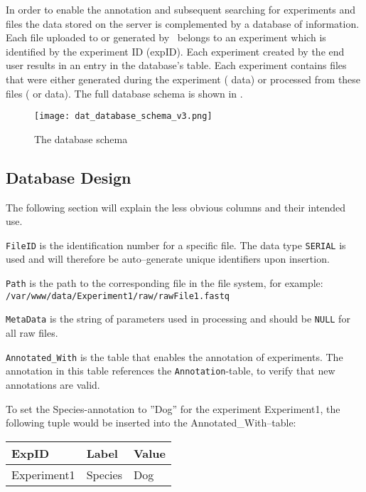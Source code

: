 In order to enable the annotation and subsequent searching for experiments and files the data stored on the server is complemented by a database of information. Each file uploaded to or generated by \appName\ belongs to an experiment which is identified by the experiment ID (expID). Each experiment created by the end user results in an entry in the database's  table. Each experiment contains files that were either generated during the experiment ( data) or processed from these files ( or  data). The full database schema is shown in .

\begin{figure}[p]
\centering
\texttt{[image: dat\_database\_schema\_v3.png]}
\caption{The database schema}
\label{fig:dat_databaseSchema}
\end{figure}

\FloatBarrier

\subsection{Database Design}
The following section will explain the less obvious columns and their intended use.

\texttt{FileID} is the identification number for a specific file. The data type \texttt{SERIAL} is used and will therefore be auto--generate unique identifiers upon insertion.

\texttt{Path} is the path to the corresponding file in the file system, for example: \\
\texttt{/var/www/data/Experiment1/raw/rawFile1.fastq}

\texttt{MetaData} is the string of parameters used in processing and should be \texttt{NULL} for all raw files.

\texttt{Annotated\_With} is the table that enables the annotation of experiments. The annotation in this table references the \texttt{Annotation}-table, to verify that new annotations are valid.

\begin{example}
To set the Species-annotation to ''Dog'' for the experiment Experiment1, the following tuple would be inserted into the Annotated\_With--table:
  \begin{center}
    \begin{tabular}{| l | l | l |}
      \hline
        \cellcolor{blue!25} ExpID & \cellcolor{blue!25} Label & \cellcolor{blue!25} Value \\
      \hline
      Experiment1 & Species & Dog \\
      \hline
      
    \end{tabular}
  \end{center}
\end{example}

